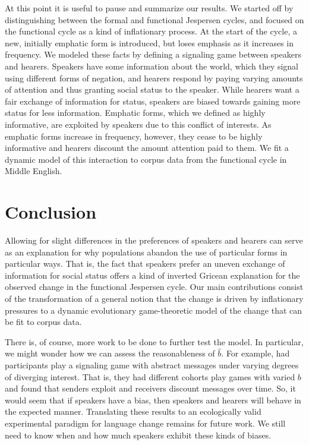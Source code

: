\documentclass[linguex]{sp}
\theoremstyle{definition} \newtheorem{definition}{Definition}
\begin{document}
At this point it is useful to pause and summarize our results. We started off by distinguishing between the formal and functional Jespersen cycles, and focused on the functional cycle as a kind of inflationary process. At the start of the cycle, a new, initially emphatic form is introduced, but loses emphasis as it increases in frequency. We modeled these facts by defining a signaling game between speakers and hearers. Speakers have some information about the world, which they signal using different forms of negation, and hearers respond by paying varying amounts of attention and thus granting social status to the speaker. While hearers want a fair exchange of information for status, speakers are biased towards gaining more status for less information. Emphatic forms, which we defined as highly informative, are exploited by speakers due to this conflict of interests. As emphatic forms increase in frequency, however, they cease to be highly informative and hearers discount the amount attention paid to them. We fit a dynamic model of this interaction to corpus data from the functional cycle in Middle English.

\section{Conclusion}
\label{Conclusion}

Allowing for slight differences in the preferences of speakers and hearers can serve as an explanation for why populations abandon the use of particular forms in particular ways. That is, the fact that speakers prefer an uneven exchange of information for social status offers a kind of inverted Gricean explanation for the observed change in the functional Jespersen cycle. Our main contributions consist of the transformation of a general notion that the change is driven by inflationary pressures to a dynamic evolutionary game-theoretic model of the change that can be fit to corpus data. 

There is, of course, more work to be done to further test the model. In particular, we might wonder how we can assess the reasonableness of $\hat{b}$. For example, \cite{blume-etal:2001} had participants play a signaling game with abstract messages under  varying degrees of diverging interest. That is, they had different cohorts play games with varied $b$ and found that senders exploit and receivers discount messages over time. So, it would seem that if speakers have a bias, then speakers and hearers will behave in the expected manner. Translating these results to an ecologically valid experimental paradigm for language change remains for future work. We still need to know when and how much speakers exhibit these kinds of biases. 
\end{document}
